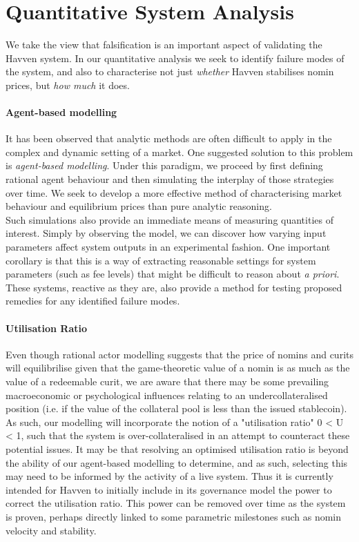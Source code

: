 \section{Quantitative System Analysis}

We take the view that falsification is an important aspect of validating
the Havven system. In our quantitative analysis we seek to identify failure modes
of the system, and also to characterise not just \textit{whether} Havven stabilises
nomin prices, but \textit{how much} it does.

\paragraph{Agent-based modelling} It has been observed that analytic methods are often difficult to
apply in the complex and dynamic setting of a market.
One suggested solution to this problem is \textit{agent-based modelling}.
Under this paradigm, we proceed by first defining rational agent behaviour
and then simulating the interplay of those strategies over time.
We seek to develop a more effective
method of characterising market behaviour and equilibrium prices than pure analytic reasoning.~\cite{poggio2001agent}\\

\noindent Such simulations also provide an immediate means of measuring
quantities of interest. Simply by observing
the model, we can discover how varying input parameters
affect system outputs in an experimental fashion.
One important corollary is that this is a way of extracting reasonable
settings for system parameters (such as fee levels) that might be difficult
to reason about \textit{a priori}. These systems, reactive as they are,
also provide a method for testing proposed remedies for any identified failure
modes.

\paragraph{Utilisation Ratio} Even though rational actor modelling suggests that the price of nomins and curits will equilibrilise given that the game-theoretic value of a nomin is as much as the value of a redeemable curit, we are aware that there may be some prevailing macroeconomic or psychological influences relating to an undercollateralised position (i.e. if the value of the collateral pool is less than the issued stablecoin). As such, our modelling will incorporate the notion of a "utilisation ratio" 0 < U < 1, such that the system is over-collateralised in an attempt to counteract these potential issues. It may be that resolving an optimised utilisation ratio is beyond the ability of our agent-based modelling to determine, and as such, selecting this may need to be informed by the activity of a live system. Thus it is currently intended for Havven to initially include in its governance model the power to correct the utilisation ratio. This power can be removed over time as the system is proven, perhaps directly linked to some parametric milestones such as nomin velocity and stability.

